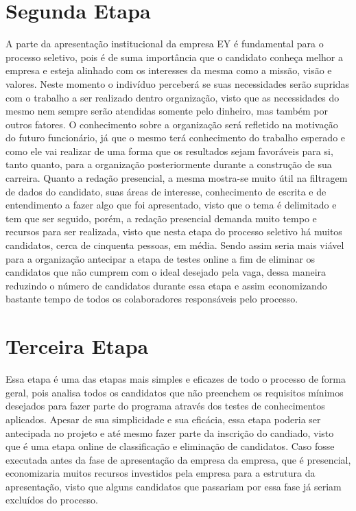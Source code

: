 \section{Segunda Etapa}
A parte da apresentação institucional da empresa EY é fundamental para o processo seletivo, pois é de suma importância que o candidato conheça melhor a empresa e esteja alinhado com os interesses da mesma como a missão, visão e valores. Neste momento o indivíduo perceberá se suas necessidades serão supridas com o trabalho a ser realizado dentro organização, visto que as necessidades do mesmo nem sempre serão atendidas somente pelo dinheiro, mas também por outros fatores. O conhecimento sobre a organização será refletido na motivação do futuro funcionário, já que o mesmo terá conhecimento do trabalho esperado e como ele vai realizar de uma forma que os resultados sejam favoráveis para si, tanto quanto, para a organização posteriormente durante a construção de sua carreira.
Quanto a redação presencial, a mesma mostra-se muito útil na filtragem de dados do candidato, suas áreas de interesse, conhecimento de escrita e de entendimento a fazer algo que foi apresentado, visto que o tema é delimitado e tem que ser seguido, porém, a redação presencial demanda muito tempo e recursos para ser realizada, visto que nesta etapa do processo seletivo há muitos candidatos, cerca de cinquenta pessoas, em média. Sendo assim seria mais viável para a organização antecipar a etapa de testes online a fim de eliminar os candidatos que não cumprem com o ideal desejado pela vaga, dessa maneira reduzindo o número de candidatos durante essa etapa e assim economizando bastante tempo de todos os colaboradores responsáveis pelo processo.

\section{Terceira Etapa}
Essa etapa é uma das etapas mais simples e eficazes de todo o processo de forma geral, pois analisa todos os candidatos que não preenchem os requisitos mínimos desejados para fazer parte do programa através dos testes de conhecimentos aplicados. Apesar de sua simplicidade e sua eficácia, essa etapa poderia ser antecipada no projeto e até mesmo fazer parte da inscrição do candiado, visto que é uma etapa online de classificação e eliminação de candidatos. Caso fosse executada antes da fase de apresentação da empresa da empresa, que é presencial, economizaria muitos recursos investidos pela empresa para a estrutura da apresentação, visto que alguns candidatos que passariam por essa fase já seriam excluídos do processo. 


